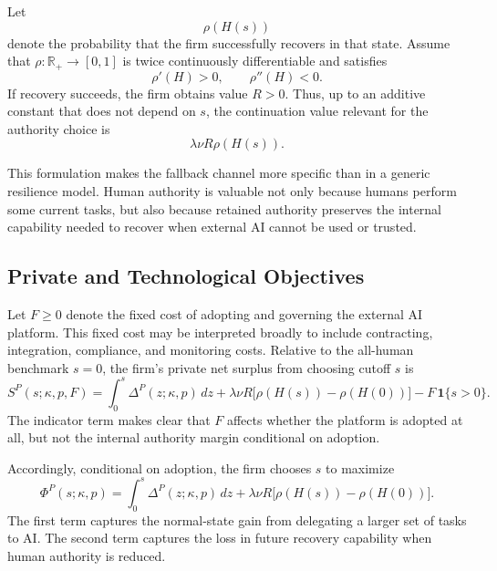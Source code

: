 Let
\begin{equation}
\label{eq:rho}
\rho(H(s))
\end{equation}
denote the probability that the firm successfully recovers in that state. Assume that $\rho:\mathbb{R}_+\to[0,1]$ is twice continuously differentiable and satisfies
\begin{equation}
\label{eq:rho-props}
\rho'(H)>0,
\qquad
\rho''(H)<0.
\end{equation}
If recovery succeeds, the firm obtains value $R>0$. Thus, up to an additive constant that does not depend on $s$, the continuation value relevant for the authority choice is
\begin{equation}
\label{eq:continuation}
\lambda \nu R \rho(H(s)).
\end{equation}

This formulation makes the fallback channel more specific than in a generic resilience model. Human authority is valuable not only because humans perform some current tasks, but also because retained authority preserves the internal capability needed to recover when external AI cannot be used or trusted.

\subsection{Private and Technological Objectives}
\label{subsec:objectives}

Let $F\ge 0$ denote the fixed cost of adopting and governing the external AI platform. This fixed cost may be interpreted broadly to include contracting, integration, compliance, and monitoring costs. Relative to the all-human benchmark $s=0$, the firm's private net surplus from choosing cutoff $s$ is
\begin{equation}
\label{eq:SP}
S^P(s;\kappa,p,F)
=
\int_0^s \Delta^P(z;\kappa,p)\,dz
+
\lambda \nu R \bigl[\rho(H(s))-\rho(H(0))\bigr]
-
F\,\mathbf{1}\{s>0\}.
\end{equation}
The indicator term makes clear that $F$ affects whether the platform is adopted at all, but not the internal authority margin conditional on adoption.

Accordingly, conditional on adoption, the firm chooses $s$ to maximize
\begin{equation}
\label{eq:PhiP}
\Phi^P(s;\kappa,p)
=
\int_0^s \Delta^P(z;\kappa,p)\,dz
+
\lambda \nu R \bigl[\rho(H(s))-\rho(H(0))\bigr].
\end{equation}
The first term captures the normal-state gain from delegating a larger set of tasks to AI. The second term captures the loss in future recovery capability when human authority is reduced.

